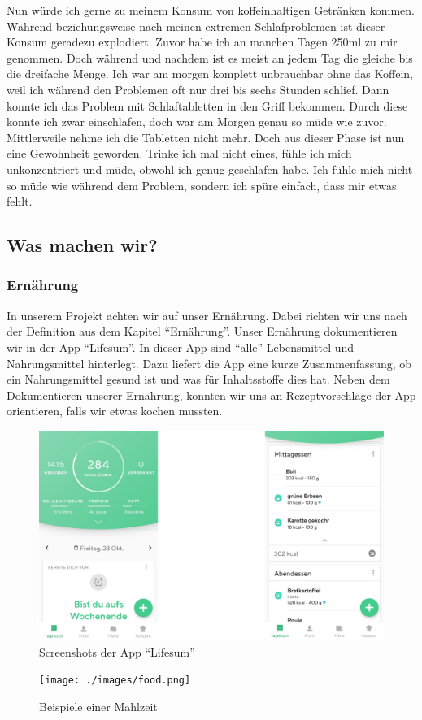 \newline
Nun würde ich gerne zu meinem Konsum von koffeinhaltigen Getränken kommen. Während beziehungsweise nach meinen extremen Schlafproblemen ist dieser Konsum geradezu explodiert. Zuvor habe ich an manchen Tagen 250ml zu mir genommen. Doch während und nachdem ist es meist an jedem Tag die gleiche bis die dreifache Menge. Ich war am morgen komplett unbrauchbar ohne das Koffein, weil ich während den Problemen oft nur drei bis sechs Stunden schlief. Dann konnte ich das Problem mit Schlaftabletten in den Griff bekommen. Durch diese konnte ich zwar einschlafen, doch war am Morgen genau so müde wie zuvor. Mittlerweile nehme ich die Tabletten nicht mehr. Doch aus dieser Phase ist nun eine Gewohnheit geworden. Trinke ich mal nicht eines, fühle ich mich unkonzentriert und müde, obwohl ich genug geschlafen habe. Ich fühle mich nicht so müde wie während dem Problem, sondern ich spüre einfach, dass mir etwas fehlt.
\pagebreak
\subsection{Was machen wir?}
\subsubsection{Ernährung}
In unserem Projekt achten wir auf unser Ernährung. Dabei richten wir uns nach der Definition aus dem Kapitel “Ernährung”.
\newline
Unser Ernährung dokumentieren wir in der App “Lifesum”. In dieser App sind “alle” Lebensmittel und Nahrungsmittel hinterlegt. Dazu liefert die App eine kurze Zusammenfassung, ob ein Nahrungsmittel gesund ist und was für Inhaltsstoffe dies hat. Neben dem Dokumentieren unserer Ernährung, konnten wir uns an Rezeptvorschläge der App orientieren, falls wir etwas kochen mussten.
\newline
\begin{figure}[!ht]
  \centering
  \includegraphics[width=0.7\linewidth]{./images/app.png}
  \caption{Screenshots der App “Lifesum”}
  \label{fig:app_1}
\end{figure}
\newline
\begin{figure}[!ht]
  \centering
  \texttt{[image: ./images/food.png]}
  \caption{Beispiele einer Mahlzeit}
  \label{fig:app_1}
\end{figure}
\newline

